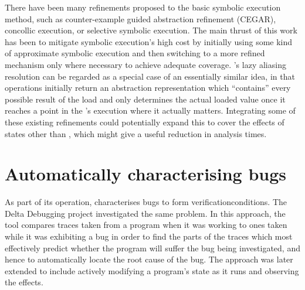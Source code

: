 There have been many refinements proposed to the basic symbolic
execution method, such as counter-example guided abstraction
refinement\cite{Clarke2003} (CEGAR), concollic
execution\cite{Sen2005}, or selective symbolic
execution\cite{Chipounov2009}.  The main thrust of this work has been
to mitigate symbolic execution's high cost by initially using some
kind of approximate symbolic execution and then switching to a more
refined mechanism only where necessary to achieve adequate coverage.
{\Technique}'s lazy aliasing resolution can be regarded as a special
case of an essentially similar idea, in that  operations
initially return an abstraction representation which ``contains''
every possible result of the load and {\technique} only determines the
actual loaded value once it reaches a point in the {\StateMachine}'s
execution where it actually matters.  Integrating some of these
existing refinements could potentially expand this to cover the
effects of states other than , which might give a useful
reduction in analysis times.

\section{Automatically characterising bugs}
\label{sect:rw:auto_characterise}

As part of its operation, {\technique} characterises bugs to form
\glspl{verificationcondition}.  The Delta Debugging\cite{Cleve2005}
project investigated the same problem.  In this approach, the tool
compares traces taken from a program when it was working to ones taken
while it was exhibiting a bug in order to find the parts of the traces
which most effectively predict whether the program will suffer the bug
being investigated, and hence to automatically locate the root cause
of the bug.  The approach was later extended to include actively
modifying a program's state as it runs and observing the
effects\cite{Jeffrey2009}.

